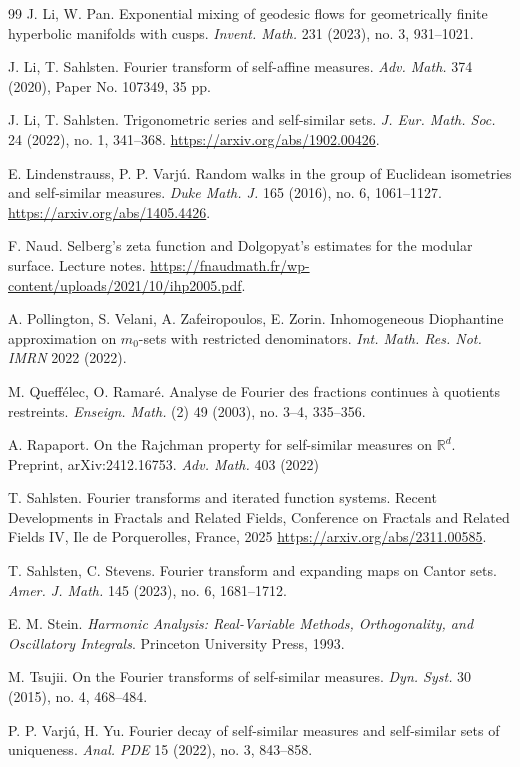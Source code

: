 \documentclass[12pt]{amsart}
\theoremstyle{definition}
\begin{document}
\begin{thebibliography}{99}
J. Li, W. Pan.
\newblock Exponential mixing of geodesic flows for geometrically finite hyperbolic manifolds with cusps.
\newblock \emph{Invent. Math.} 231 (2023), no. 3, 931--1021.

J. Li, T. Sahlsten.
\newblock Fourier transform of self-affine measures.
\newblock \emph{Adv. Math.} 374 (2020), Paper No. 107349, 35 pp.

J. Li, T. Sahlsten.
\newblock Trigonometric series and self-similar sets.
\newblock \emph{J. Eur. Math. Soc.} 24 (2022), no. 1, 341--368.
\newblock \url{https://arxiv.org/abs/1902.00426}.

E. Lindenstrauss, P. P. Varj\'u.
\newblock Random walks in the group of Euclidean isometries and self-similar measures.
\newblock \emph{Duke Math. J.} 165 (2016), no. 6, 1061--1127.
\newblock \url{https://arxiv.org/abs/1405.4426}.

F. Naud.
\newblock Selberg's zeta function and Dolgopyat's estimates for the modular surface.
\newblock Lecture notes.
\newblock \url{https://fnaudmath.fr/wp-content/uploads/2021/10/ihp2005.pdf}.

A. Pollington, S. Velani, A. Zafeiropoulos, E. Zorin.
\newblock Inhomogeneous Diophantine approximation on $m_0$-sets with restricted denominators.
\newblock \emph{Int. Math. Res. Not. IMRN} 2022 (2022).

M. Queff\'elec, O. Ramar\'e.
\newblock Analyse de Fourier des fractions continues \`a quotients restreints.
\newblock \emph{Enseign. Math.} (2) 49 (2003), no. 3--4, 335--356.

A. Rapaport.
\newblock On the {Rajchman} property for self-similar measures on {{\(\mathbb{R}^d\)}}.
\newblock Preprint, arXiv:2412.16753.
\newblock \emph{Adv. Math.} 403 (2022)


T. Sahlsten.
\newblock Fourier transforms and iterated function systems.
\newblock Recent Developments in Fractals and Related Fields, Conference on Fractals and Related Fields IV, Ile de Porquerolles, France, 2025
\newblock \url{https://arxiv.org/abs/2311.00585}.

T. Sahlsten, C. Stevens.
\newblock Fourier transform and expanding maps on Cantor sets.
\newblock \emph{Amer. J. Math.} 145 (2023), no. 6, 1681--1712.

E. M. Stein.
\newblock \emph{Harmonic Analysis: Real-Variable Methods, Orthogonality, and Oscillatory Integrals}.
\newblock Princeton University Press, 1993.

M. Tsujii.
\newblock On the Fourier transforms of self-similar measures.
\newblock \emph{Dyn. Syst.} 30 (2015), no. 4, 468--484.

P. P. Varj\'u, H. Yu.
\newblock Fourier decay of self-similar measures and self-similar sets of uniqueness.
\newblock \emph{Anal. PDE} 15 (2022), no. 3, 843--858.

\end{thebibliography}
\end{document}
